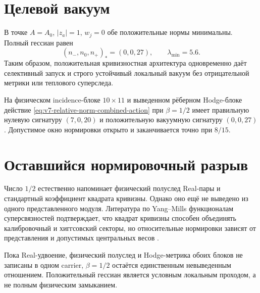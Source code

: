 \section{Целевой вакуум}

В точке $A=A_0$, $|z_a|=1$, $w_j=0$ обе положительные нормы минимальны.
Полный гессиан равен
\begin{equation}
 (n_-,n_0,n_+)_{*}=(0,0,27),
 \qquad \lambda_{\min}=5.6.
 \label{eq:v7-relative-norm-vacuum-signature}
\end{equation}
Таким образом, положительная кривизностная архитектура одновременно даёт
селективный запуск и строго устойчивый локальный вакуум без отрицательной
метрики или теплового суперследа.

\begin{theorem}
На физическом incidence-блоке $10\times11$ и выведенном рёберном Hodge-блоке
действие \eqref{eq:v7-relative-norm-combined-action} при $\beta=1/2$ имеет
правильную нулевую сигнатуру $(7,0,20)$ и положительную вакуумную сигнатуру
$(0,0,27)$. Допустимое окно нормировки открыто и заканчивается точно при
$8/15$.
\end{theorem}

\section{Оставшийся нормировочный разрыв}

Число $1/2$ естественно напоминает физический полуслед Real-пары и
стандартный коэффициент квадрата кривизны. Однако оно ещё не выведено из
одного представленного модуля. Литература по Yang--Mills функционалам
суперсвязностей подтверждает, что квадрат кривизны способен объединять
калибровочный и хиггсовский секторы, но относительные нормировки зависят от
представления и допустимых центральных весов
\cite{v7-relative-norm-roepstorff,v7-relative-norm-figueroa}.

\begin{nogocriterion}[Запрет объявлять $\beta=1/2$ выведенным]
Пока Real-удвоение, физический полуслед и Hodge-метрика обоих блоков не
записаны в одном carrier, $\beta=1/2$ остаётся единственным невыведенным
отношением. Положительный гессиан является условным локальным проходом, а не
полным физическим замыканием.
\end{nogocriterion}

